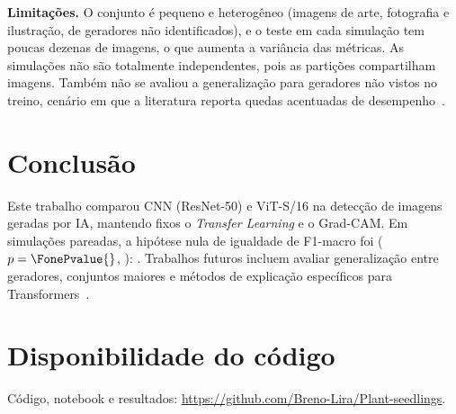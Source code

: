 \documentclass[conference]{IEEEtran}
\begin{document}
\textbf{Limitações.} O conjunto é pequeno e heterogêneo (imagens de arte, fotografia
e ilustração, de geradores não identificados), e o teste em cada simulação tem
poucas dezenas de imagens, o que aumenta a variância das métricas. As simulações não
são totalmente independentes, pois as partições compartilham imagens. Também não se
avaliou a generalização para geradores não vistos no treino, cenário em que a
literatura reporta quedas acentuadas de desempenho~\cite{ojha2023universal}.

\section{Conclusão}
Este trabalho comparou CNN (ResNet-50) e ViT-S/16 na detecção de imagens geradas por
IA, mantendo fixos o \emph{Transfer Learning} e o Grad-CAM. Em \NSim{} simulações
pareadas, a hipótese nula de igualdade de F1-macro foi \Rejected{}
($p=\FonePvalue{}$, \FoneTest{}): \ConclusionText{}.
Trabalhos futuros incluem avaliar generalização entre geradores, conjuntos maiores e
métodos de explicação específicos para Transformers~\cite{abnar2020rollout}.

\section*{Disponibilidade do código}
Código, notebook e resultados: \url{https://github.com/Breno-Lira/Plant-seedlings}.



\end{document}
